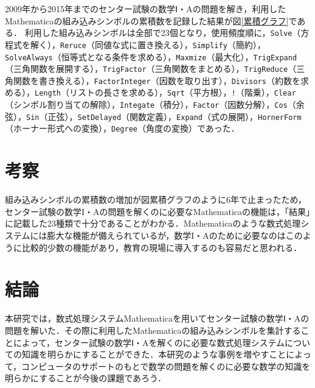 \documentclass[uplatex,twocolumn]{jsarticle}
\begin{document}
2009年から2015年までのセンター試験の数学Ⅰ・Aの問題を解き，利用したMathematicaの組み込みシンボルの累積数を記録した結果が図\ref{累積グラフ}である．
利用した組み込みシンボルは全部で23個となり，使用頻度順に，\verb|Solve|（方程式を解く），\verb|Reruce|（同値な式に置き換える），\verb|Simplify|（簡約），\verb|SolveAlways|（恒等式となる条件を求める），\verb|Maxmize|（最大化），\verb|TrigExpand|（三角関数を展開する），\verb|TrigFactor|（三角関数をまとめる），\verb|TrigReduce|（三角関数を書き換える），\verb|FactorInteger|（因数を取り出す），\verb|Divisors|（約数を求める），\verb|Length|（リストの長さを求める），\verb|Sqrt|（平方根），\verb|!|（階乗），\verb|Clear|（シンボル割り当ての解除），\verb|Integate|（積分），\verb|Factor|（因数分解），\verb|Cos|（余弦），\verb|Sin|（正弦），\verb|SetDelayed|（関数定義），\verb|Expand|（式の展開），\verb|HornerForm|（ホーナー形式への変換），\verb|Degree|（角度の変換）であった．

\section{考察}
組み込みシンボルの累積数の増加が図{累積グラフ}のように6年で止まったため，センター試験の数学I・Aの問題を解くのに必要なMathematicaの機能は，「結果」に記載した23種類で十分であることがわかる．Mathematicaのような数式処理システムには膨大な機能が備えられているが，数学I・Aのために必要なのはこのように比較的少数の機能があり，教育の現場に導入するのも容易だと思われる．

\section{結論}
本研究では，数式処理システムMathematicaを用いてセンター試験の数学Ⅰ・Aの問題を解いた．その際に利用したMathematicaの組み込みシンボルを集計することによって，センター試験の数学Ⅰ・Aを解くのに必要な数式処理システムについての知識を明らかにすることができた．本研究のような事例を増やすことによって，コンピュータのサポートのもとで数学の問題を解くのに必要な数学の知識を明らかにすることが今後の課題であろう．





\end{document}
